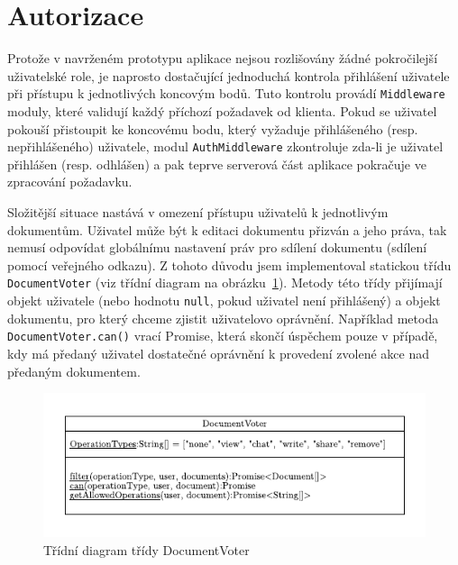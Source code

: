 
\section{Autorizace}\label{sec:autorizace}

Protože v navrženém prototypu aplikace nejsou rozlišovány žádné pokročilejší uživatelské role, je naprosto dostačující jednoduchá kontrola přihlášení uživatele při přístupu k jednotlivých koncovým bodů.
Tuto kontrolu provádí \texttt{Middleware} moduly, které validují každý příchozí požadavek od klienta.
Pokud se uživatel pokouší přistoupit ke koncovému bodu, který vyžaduje přihlášeného (resp. nepřihlášeného) uživatele, modul \texttt{AuthMiddleware} zkontroluje zda-li je uživatel přihlášen (resp. odhlášen) a pak teprve serverová část aplikace pokračuje ve zpracování požadavku.

Složitější situace nastává v omezení přístupu uživatelů k jednotlivým dokumentům.
Uživatel může být k editaci dokumentu přizván a jeho práva, tak nemusí odpovídat globálnímu nastavení práv pro sdílení dokumentu (sdílení pomocí veřejného odkazu).
Z tohoto důvodu jsem implementoval statickou třídu \texttt{DocumentVoter} (viz třídní diagram na obrázku~\ref{fig:DocumentVoter}).
Metody této třídy přijímají objekt uživatele (nebo hodnotu \texttt{null}, pokud uživatel není přihlášený) a objekt dokumentu, pro který chceme zjistit uživatelovo oprávnění.
Například metoda \texttt{DocumentVoter.can()} vrací Promise, která skončí úspěchem pouze v případě, kdy má předaný uživatel dostatečné oprávnění k provedení zvolené akce nad předaným dokumentem.

\begin{figure}[ht!]
    \centering
    \includegraphics[width=\textwidth]{partials/realizace/DocumentVoter.pdf}
    \caption{Třídní diagram třídy DocumentVoter}\label{fig:DocumentVoter}
\end{figure}

